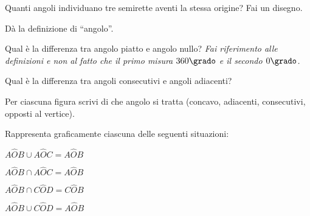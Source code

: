 \begin{esercizio}
\label{ese:1.53}
Quanti angoli individuano tre semirette aventi la stessa origine? Fai 
un disegno.
\end{esercizio}

\begin{esercizio}
\label{ese:1.54}
Dà la definizione di ``angolo''.
\end{esercizio}

\begin{esercizio}
\label{ese:1.55}
Qual è la differenza tra angolo piatto e angolo nullo? \emph{Fai 
riferimento alle definizioni e non al fatto che il primo misura 
$360\grado$ e il secondo $0\grado$.}
\end{esercizio}

\begin{esercizio}
\label{ese:1.56}
Qual è la differenza tra angoli consecutivi e angoli adiacenti?
\end{esercizio}

\begin{esercizio}
\label{ese:1.57}
Per ciascuna figura scrivi di che angolo si tratta 
(concavo, adiacenti, consecutivi, opposti al vertice).
\end{esercizio}

\begin{inaccessibleblock}
 \centering
\end{inaccessibleblock}

\newpage %

\begin{esercizio}
\label{ese:1.58}
Rappresenta graficamente ciascuna delle seguenti situazioni:
\begin{multicols}{2}
\begin{enumeratea}
\item $A\widehat{O}B\cup A\widehat{O}C=A\widehat{O}B$
\item $A\widehat{O}B\cap A\widehat{O}C=A\widehat{O}B$
\item $A\widehat{O}B\cap C\widehat{O}D=C\widehat{O}B$
\item $A\widehat{O}B\cup C\widehat{O}D=A\widehat{O}B$
\end{enumeratea}
\end{multicols}
\end{esercizio}

